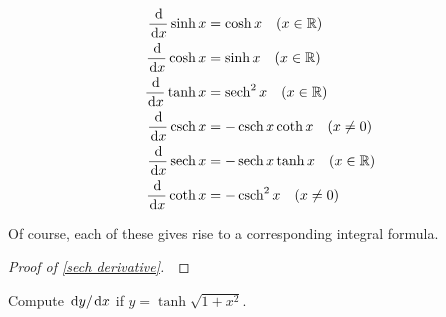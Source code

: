 \begin{theorem}
\begin{align}
\frac{\mkern 2mu \mathrm{d}}{\mkern 2mu \mathrm{d} x}\sinh x &= \cosh x\quad (x\in\mathbb R)\label{sinh derivative}\\
\frac{\mkern 2mu \mathrm{d}}{\mkern 2mu \mathrm{d} x}\cosh x &= \sinh x\quad (x\in\mathbb R)\\
\frac{\mkern 2mu \mathrm{d}}{\mkern 2mu \mathrm{d} x}\tanh x &= \operatorname{sech}^2 x\quad (x\in\mathbb R) \label{sech derivative}\\
\frac{\mkern 2mu \mathrm{d}}{\mkern 2mu \mathrm{d} x}\operatorname{csch} x &= -\operatorname{csch} x\coth x\quad (x\ne 0)\\
\frac{\mkern 2mu \mathrm{d}}{\mkern 2mu \mathrm{d} x}\operatorname{sech} x &= -\operatorname{sech} x\tanh x\quad (x\in \mathbb R)\\
\frac{\mkern 2mu \mathrm{d}}{\mkern 2mu \mathrm{d} x}\coth x &= -\operatorname{csch}^2 x\quad (x\ne 0)
\end{align}
\end{theorem}
\begin{remark}
Of course, each of these gives rise to a corresponding integral formula.
\end{remark}
\ifdefined\SOLUTION
{}
\else
\begin{proof}[Proof of \eqref{sech derivative}]\,

\vspace{5in}
\end{proof}
\fi

\newpage

\begin{example}
Compute $\mkern 2mu \mathrm{d} y/\mkern 2mu \mathrm{d} x$ if $y=\tanh \sqrt{1+x^2}$.
\end{example}
\ifdefined\SOLUTION
{}
\else
\fi
\vfill

